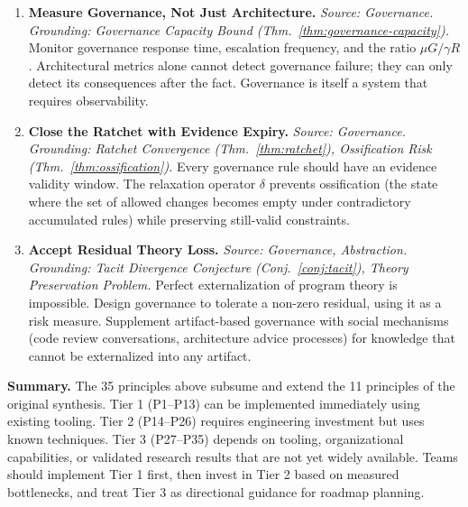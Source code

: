 \begin{enumerate}[label=\textbf{P\arabic*.}, leftmargin=3em, resume]
\item \textbf{Measure Governance, Not Just Architecture.}
\emph{Source: Governance. Grounding: Governance Capacity Bound (Thm.~\ref{thm:governance-capacity}).}
Monitor governance response time, escalation frequency, and the ratio $\mu G / \gamma R$. Architectural metrics alone cannot detect governance failure; they can only detect its consequences after the fact. Governance is itself a system that requires observability.

\item \textbf{Close the Ratchet with Evidence Expiry.}
\emph{Source: Governance. Grounding: Ratchet Convergence (Thm.~\ref{thm:ratchet}), Ossification Risk (Thm.~\ref{thm:ossification}).}
Every governance rule should have an evidence validity window. The relaxation operator $\delta$ prevents ossification (the state where the set of allowed changes becomes empty under contradictory accumulated rules) while preserving still-valid constraints.

\item \textbf{Accept Residual Theory Loss.}
\emph{Source: Governance, Abstraction. Grounding: Tacit Divergence Conjecture (Conj.~\ref{conj:tacit}), Theory Preservation Problem.}
Perfect externalization of program theory is impossible. Design governance to tolerate a non-zero residual, using it as a risk measure. Supplement artifact-based governance with social mechanisms (code review conversations, architecture advice processes) for knowledge that cannot be externalized into any artifact.

\end{enumerate}

\medskip
\noindent\textbf{Summary.} The 35 principles above subsume and extend the 11 principles of the original synthesis. Tier 1 (P1--P13) can be implemented immediately using existing tooling. Tier 2 (P14--P26) requires engineering investment but uses known techniques. Tier 3 (P27--P35) depends on tooling, organizational capabilities, or validated research results that are not yet widely available. Teams should implement Tier 1 first, then invest in Tier 2 based on measured bottlenecks, and treat Tier 3 as directional guidance for roadmap planning.
